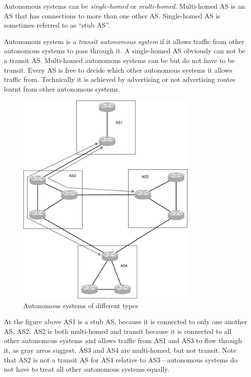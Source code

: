 Autonomous systems can be \emph{single-homed} or \emph{multi-homed}. Multi-homed AS is an AS that has connections to more than
one other AS. Single-homed AS is sometimes referred to as ``stub AS''.

Autonomous system is a \emph{transit autonomous system} if it allows traffic from other autonomous systems to pass through it.
A single-homed AS obviously can not be a transit AS. Multi-homed autonomous systems can be but do not have to be transit.
Every AS is free to decide which other autonomous systems it allows traffic from. Technically it is achieved by advertising
or not advertising routes learnt from other autonomous systems.

\begin{figure}[t]
    \centering
    \includegraphics[width=0.8\textwidth]{graphics/as_types.eps}
    \caption{Autonomous systems of different types}
    \label{fig:as_types}
\end{figure}

At the figure above AS1 is a stub AS, because it is connected to only one another AS, AS2. AS2 is both multi-homed
and transit because it is connected to all other autonomous systems and allows traffic from AS1 and AS3 to flow through it,
as gray arros suggest. AS3 and AS4 are multi-homed, but not transit. Note that AS2 is not a transit AS for AS4 relative to
AS3---autonomous systems do not have to treat all other autonomous systems equally.

